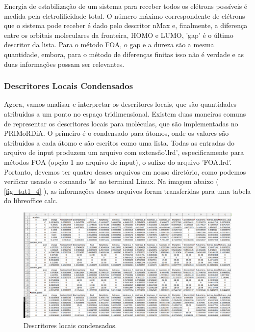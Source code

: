 \documentclass[a4paper,11pt]{refart}
\begin{document}
Energia de estabilização de um sistema para receber todos os elétrons possíveis é medida pela eletrofilicidade total. O número máximo correspondente de elétrons que o sistema pode receber é dado pelo descritor nMax e, finalmente, a diferença entre os orbitais moleculares da fronteira, HOMO e LUMO, 'gap' é o último descritor da lista. Para o método FOA, o gap e a dureza são a mesma quantidade, embora, para o método de diferenças finitas isso não é verdade e as duas informações possam ser relevantes.


\subsubsection{Descritores Locais Condensados}

Agora, vamos analisar e interpretar os descritores locais, que são quantidades atribuídas a um ponto no espaço tridimensional. Existem duas maneiras comuns de representar os descritores locais para moléculas, que são implementadas no PRIMoRDiA. O primeiro é o condensado para átomos, onde os valores são atribuídos a cada átomo e são escritos como uma lista. Todas as entradas do arquivo de input produzem um arquivo com extensão'.lrd', especificamente para métodos FOA (opção 1 no arquivo de input), o sufixo do arquivo 'FOA.lrd'. Portanto, devemos ter quatro desses arquivos em nosso diretório, como podemos verificar usando o comando 'ls' no terminal Linux. Na imagem abaixo ( \autoref{fig_tut1_4} ), as informações desses arquivos foram transferidas para uma tabela do libreoffice calc.

\hspace*{-\leftmarginwidth}
\begin{minipage}{\fullwidth}
\begin{figure}[H]
\begin{center}
\includegraphics[width=6in]{images/img5}
\caption{Descritores locais condensados.}
\label{fig_tut1_4}
\end{center}
\end{figure}
\end{minipage}
\end{document}
